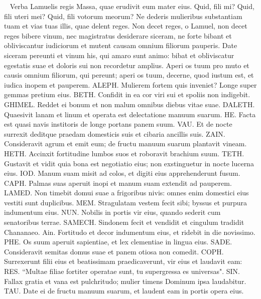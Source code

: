\begin{biblechapter}   
\verse Verba Lamuelis regis Massa, quae erudivit eum mater eius. 
\verse Quid, fili mi? Quid, fili uteri mei? Quid, fili votorum meorum? 
\verse Ne dederis mulieribus substantiam tuam et vias tuas illis, quae delent reges. 
\verse Non decet reges, o Lamuel, non decet reges bibere vinum, nec magistratus desiderare siceram, 
\verse ne forte bibant et obliviscantur iudiciorum et mutent causam omnium filiorum pauperis. 
\verse Date siceram pereunti et vinum his, qui amaro sunt animo: 
\verse bibat et obliviscatur egestatis suae et doloris sui non recordetur amplius. 
\verse Aperi os tuum pro muto et causis omnium filiorum, qui pereunt; 
\verse aperi os tuum, decerne, quod iustum est, et iudica inopem et pauperem. 
\verse ALEPH. Mulierem fortem quis inveniet? Longe super gemmas pretium eius. 
\verse BETH. Confidit in ea cor viri sui et spoliis non indigebit. 
\verse GHIMEL. Reddet ei bonum et non malum omnibus diebus vitae suae. 
\verse DALETH. Quaesivit lanam et linum et operata est delectatione manuum suarum. 
\verse HE. Facta est quasi navis institoris de longe portans panem suum. 
\verse VAU. Et de nocte surrexit deditque praedam domesticis suis et cibaria ancillis suis. 
\verse ZAIN. Consideravit agrum et emit eum; de fructu manuum suarum plantavit vineam. 
\verse HETH. Accinxit fortitudine lumbos suos et roboravit brachium suum. 
\verse TETH. Gustavit et vidit quia bona est negotiatio eius; non exstinguetur in nocte lucerna eius. 
\verse IOD. Manum suam misit ad colos, et digiti eius apprehenderunt fusum. 
\verse CAPH. Palmas suas aperuit inopi et manum suam extendit ad pauperem. 
\verse LAMED. Non timebit domui suae a frigoribus nivis: omnes enim domestici eius vestiti sunt duplicibus. 
\verse MEM. Stragulatam vestem fecit sibi; byssus et purpura indumentum eius. 
\verse NUN. Nobilis in portis vir eius, quando sederit cum senatoribus terrae. 
\verse SAMECH. Sindonem fecit et vendidit et cingulum tradidit Chananaeo. 
\verse Ain. Fortitudo et decor indumentum eius, et ridebit in die novissimo. 
\verse PHE. Os suum aperuit sapientiae, et lex clementiae in lingua eius. 
\verse SADE. Consideravit semitas domus suae et panem otiosa non comedit. 
\verse COPH. Surrexerunt filii eius et beatissimam praedicaverunt, vir eius et laudavit eam: 
\verse RES. “Multae filiae fortiter operatae sunt, tu supergressa es universas". 
\verse SIN. Fallax gratia et vana est pulchritudo; mulier timens Dominum ipsa laudabitur. 
\verse TAU. Date ei de fructu manuum suarum, et laudent eam in portis opera eius.
\end{biblechapter}
